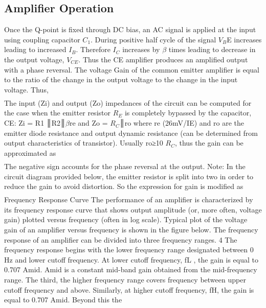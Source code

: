 \subsection*{Amplifier Operation}

Once the Q-point is fixed through DC bias, an AC signal is applied at the input using
coupling capacitor $C_1$. During positive half cycle of the signal $V_B$E increases leading to
increased $I_B$. Therefore $I_C$ increases by $\beta$ times leading to decrease in the output voltage, $V_{CE}$. Thus the CE amplifier produces an amplified output with a phase reversal. The
voltage Gain of the common emitter amplifier is equal to the ratio of the change in the
output voltage to the change in the input voltage. Thus,
\begin{align}

\end{align}
The input (Zi) and output (Zo) impedances of the circuit can be computed for the case
when the emitter resistor $R_E$ is completely bypassed by the capacitor, CE:
Zi = R1 ║R2║$\beta$re and Zo = $R_C$║ro
where re (26mV/IE) and ro are the emitter diode resistance and output dynamic resistance
(can be determined from output characteristics of transistor). Usually ro≥10 $R_C$, thus the
gain can be approximated as
\begin{align}

\end{align}
The negative sign accounts for the phase reversal at the output.
Note: In the circuit diagram provided below, the emitter resistor is split into two in order
to reduce the gain to avoid distortion. So the expression for gain is modified as
\begin{align}

\end{align}
Frequency Response Curve
The performance of an amplifier is characterized by its frequency response curve that
shows output amplitude (or, more often, voltage gain) plotted versus frequency (often in
log scale). Typical plot of the voltage gain of an amplifier versus frequency is shown in
the figure below. The frequency response of an amplifier can be divided into three
frequency ranges.
4
The frequency response begins with the lower frequency range designated between 0 Hz
and lower cutoff frequency. At lower cutoff frequency, fL , the gain is equal to 0.707 Amid.
Amid is a constant mid-band gain obtained from the mid-frequency range. The third, the
higher frequency range covers frequency between upper cutoff frequency and above.
Similarly, at higher cutoff frequency, fH, the gain is equal to 0.707 Amid. Beyond this the
